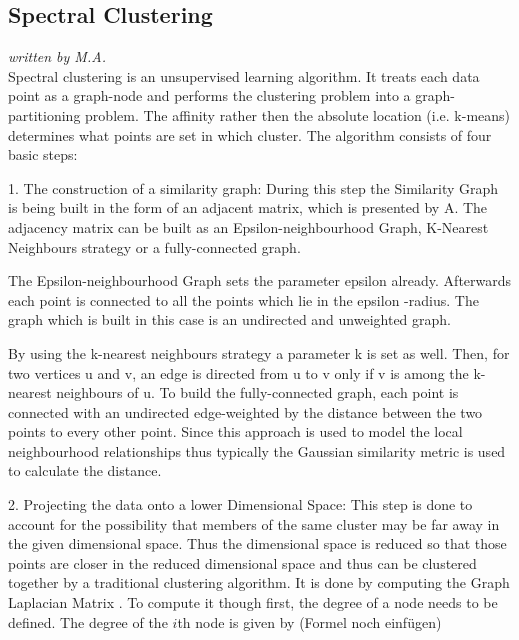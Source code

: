 \subsection{Spectral Clustering}
\textit{written by M.A.}\\

Spectral clustering is an unsupervised learning algorithm. It treats each data point as a graph-node and performs the clustering problem into a graph-partitioning problem. The affinity rather then the absolute location (i.e. k-means) determines what points are set in which cluster.
The algorithm consists of four basic steps: \newline

1.	The construction of a similarity graph:\newline
During this step the Similarity Graph is being built in the form of an adjacent matrix, which is presented by A. The adjacency matrix can be built as an Epsilon-neighbourhood Graph, K-Nearest Neighbours strategy or a fully-connected graph. \newline

The Epsilon-neighbourhood Graph sets the parameter epsilon already. Afterwards each point is connected to all the points which lie in the epsilon -radius. The graph which is built in this case is an undirected and unweighted graph. \newline

By using the k-nearest neighbours strategy a parameter k is set as well. Then, for two vertices u and v, an edge is directed from u to v only if v is among the k-nearest neighbours of u. 
To build the fully-connected graph, each point is connected with an undirected edge-weighted by the distance between the two points to every other point. Since this approach is used to model the local neighbourhood relationships thus typically the Gaussian similarity metric is used to calculate the distance. \newline


2.	Projecting the data onto a lower Dimensional Space: This step is done to account for the possibility that members of the same cluster may be far away in the given dimensional space. Thus the dimensional space is reduced so that those points are closer in the reduced dimensional space and thus can be clustered together by a traditional clustering algorithm. It is done by computing the Graph Laplacian Matrix . To compute it though first, the degree of a node needs to be defined. The degree of the $i$th node is given by (Formel noch einfügen) \newline

